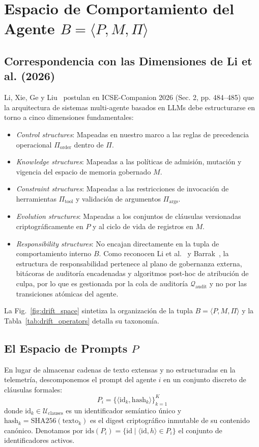 \documentclass[conference]{IEEEtran}
\begin{document}
\section{Espacio de Comportamiento del Agente $B = \langle P, M, \Pi \rangle$}

\subsection{Correspondencia con las Dimensiones de Li et al. (2026)}
Li, Xie, Ge y Liu~\cite{li2026} postulan en ICSE-Companion 2026 (Sec. 2, pp. 484--485) que la arquitectura de sistemas multi-agente basados en LLMs debe estructurarse en torno a cinco dimensiones fundamentales:
\begin{itemize}
    \item \emph{Control structures}: Mapeadas en nuestro marco a las reglas de precedencia operacional $\Pi_{\text{order}}$ dentro de $\Pi$.
    \item \emph{Knowledge structures}: Mapeadas a las pol\'iticas de admisi\'on, mutaci\'on y vigencia del espacio de memoria gobernado $M$.
    \item \emph{Constraint structures}: Mapeadas a las restricciones de invocaci\'on de herramientas $\Pi_{\text{tool}}$ y validaci\'on de argumentos $\Pi_{\text{args}}$.
    \item \emph{Evolution structures}: Mapeadas a los conjuntos de cl\'ausulas versionadas criptogr\'aficamente en $P$ y al ciclo de vida de registros en $M$.
    \item \emph{Responsibility structures}: No encajan directamente en la tupla de comportamiento interno $B$. Como reconocen Li et al.~\cite{li2026} y Barrak~\cite{barrak2025}, la estructura de responsabilidad pertenece al plano de gobernanza externa, bit\'acoras de auditor\'ia encadenadas y algoritmos post-hoc de atribuci\'on de culpa, por lo que es gestionada por la cola de auditor\'ia $\mathcal{Q}_{\text{audit}}$ y no por las transiciones at\'omicas del agente.
\end{itemize}

La Fig.~\ref{fig:drift_space} sintetiza la organizaci\'on de la tupla $B = \langle P, M, \Pi \rangle$ y la Tabla~\ref{tab:drift_operators} detalla su taxonom\'ia.

\subsection{El Espacio de Prompts $P$}
En lugar de almacenar cadenas de texto extensas y no estructuradas en la telemetr\'ia, descomponemos el prompt del agente $i$ en un conjunto discreto de cl\'ausulas formales:
\begin{equation}
P_i = \{ \langle \text{id}_k, \text{hash}_k \rangle \}_{k=1}^K
\end{equation}
donde $\text{id}_k \in \mathcal{U}_{\text{clauses}}$ es un identificador sem\'antico \'unico y $\text{hash}_k = \text{SHA256}(\text{texto}_k)$ es el digest criptogr\'afico inmutable de su contenido can\'onico. Denotamos por $\text{ids}(P_i) = \{ \text{id} \mid \langle \text{id}, h \rangle \in P_i \}$ el conjunto de identificadores activos.
\end{document}
